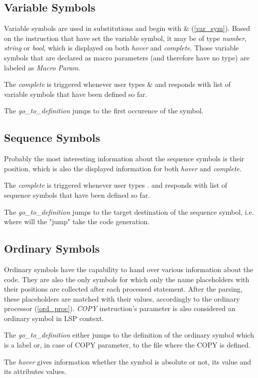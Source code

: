 \subsection{Variable Symbols}

Variable symbols are used in substitutions and begin with \& (\cref{var_sym}). Based on the instruction that have set the variable symbol, it may be of type \emph{number}, \emph{string} or \emph{bool}, which is displayed on both \emph{hover} and \emph{complete}. Those variable symbols that are declared as macro parameters (and therefore have no type) are labeled as \emph{Macro Param}.

The \emph{complete} is triggered whenever user types \& and responds with list of variable symbols that have been defined so far.

The \emph{go\_to\_definition} jumps to the first occurence of the symbol.

\subsection{Sequence Symbols}

Probably the most interesting information about the sequence symbols is their position, which is also the displayed information for both \emph{hover} and \emph{complete}.

The \emph{complete} is triggered whenever user types . and responds with list of sequence symbols that have been defined so far.

The \emph{go\_to\_definition} jumps to the target destination of the sequence symbol, i.e. where will the "jump" take the code generation.

\subsection{Ordinary Symbols}

Ordinary symbols have the capability to hand over various information about the code. They are also the only symbols for which only the name placeholders with their positions are collected after each processed statement. After the parsing, these placeholders are matched with their values, accordingly to the ordinary processor (\cref{ord_proc}). \emph{COPY} instruction's parameter is also considered an ordinary symbol in LSP context.  

The \emph{go\_to\_definition} either jumps to the definition of the ordinary symbol which is a label or, in case of COPY parameter, to the file where the COPY is defined.

The \emph{hover} gives information whether the symbol is absolute or not, its value and its attributes values. 




